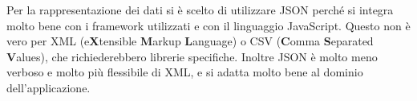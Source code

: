 Per la rappresentazione dei dati si è scelto di utilizzare JSON perché si integra molto bene con i framework utilizzati e con il linguaggio JavaScript. Questo non è vero per XML (e\textbf{X}tensible \textbf{M}arkup \textbf{L}anguage) o CSV (\textbf{C}omma \textbf{S}eparated \textbf{V}alues), che richiederebbero librerie specifiche. Inoltre JSON è molto meno verboso e molto più flessibile di XML, e si adatta molto bene al dominio dell'applicazione.
